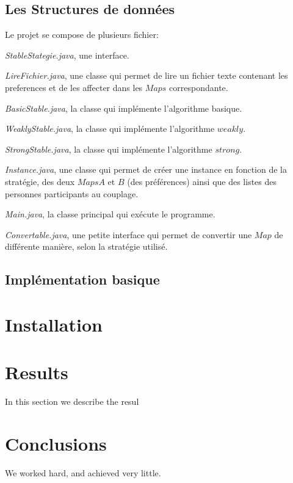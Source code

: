 \documentclass[11pt]{article}
\begin{document}
\subsection{Les Structures de données}
Le projet se compose de plusieurs fichier: 

\begin{list}{•}{}
\item \emph{StableStategie.java}, une interface.
\item \emph{LireFichier.java}, une classe qui permet de lire un fichier texte contenant les preferences et de les affecter dans les $Maps$ correspondante.
\item \emph{BasicStable.java}, la classe qui implémente l'algorithme basique.
\item \emph{WeaklyStable.java}, la classe qui implémente l'algorithme $weakly$.
\item \emph{StrongStable.java}, la classe qui implémente l'algorithme $strong$.
\item \emph{Instance.java}, une classe qui permet de créer une instance en fonction de la stratégie, des deux $Maps A$ et $B$ (des préférences) ainsi que des listes des personnes participants au couplage.
\item \emph{Main.java}, la classe principal qui exécute le programme.
\item \emph{Convertable.java}, une petite interface qui permet de convertir une $Map$ de différente manière, selon la stratégie utilisé.

\end{list}





\subsection{Implémentation basique}





\section{Installation}

\section{Results}\label{results}
In this section we describe the resul

\section{Conclusions}\label{conclusions}
We worked hard, and achieved very little.



\end{document}
